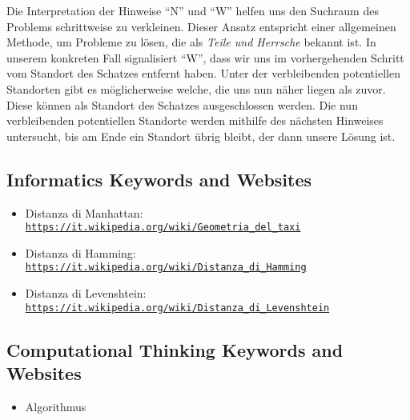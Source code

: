 \documentclass[a4paper,11pt]{report}
\newcommand{\BrochureUrlText}[1]{\texttt{#1}}
\begin{document}
Die Interpretation der Hinweise \enquote{N} und \enquote{W} helfen uns den Suchraum des Problems schrittweise zu verkleinen. Dieser Ansatz entspricht einer allgemeinen Methode, um Probleme zu lösen, die als \emph{Teile und Herrsche} bekannt ist. In unserem konkreten Fall signalisiert \enquote{W}, dass wir uns im vorhergehenden Schritt vom Standort des Schatzes entfernt haben. Unter der verbleibenden potentiellen Standorten gibt es möglicherweise welche, die uns nun näher liegen als zuvor. Diese können als Standort des Schatzes ausgeschlossen werden. Die nun verbleibenden potentiellen Standorte werden mithilfe des nächsten Hinweises untersucht, bis am Ende ein Standort übrig bleibt, der dann unsere Lösung ist.


\subsection*{Informatics Keywords and Websites}

\begin{itemize}
  \item Distanza di Manhattan: \href{https://it.wikipedia.org/wiki/Geometria_del_taxi}{\BrochureUrlText{https://it.wikipedia.org/wiki/Geometria\_del\_taxi}}
  \item Distanza di Hamming: \href{https://it.wikipedia.org/wiki/Distanza_di_Hamming}{\BrochureUrlText{https://it.wikipedia.org/wiki/Distanza\_di\_Hamming}}
  \item Distanza di Levenshtein: \href{https://it.wikipedia.org/wiki/Distanza_di_Levenshtein}{\BrochureUrlText{https://it.wikipedia.org/wiki/Distanza\_di\_Levenshtein}}
\end{itemize}


\subsection*{Computational Thinking Keywords and Websites}

\begin{itemize}
  \item Algorithmus
\end{itemize}
\end{document}
